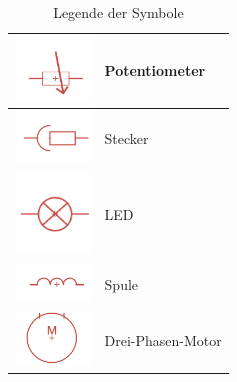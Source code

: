 \begin{table}[ht]
{\begin{tabular}{|m{5cm}|m{7cm}|}
			\hline
			\centering\includegraphics[width=2cm]{Legende/Potentiometer.png} & \centering Potentiometer \tabularnewline
			\hline
			\centering\includegraphics[width=2cm]{Legende/Stecker.png} & \centering Stecker \tabularnewline
			\hline
			\centering\includegraphics[width=2cm]{Legende/LED.png} & \centering LED \tabularnewline
			\hline
			\centering\includegraphics[width=2cm]{Legende/Spule.png} & \centering Spule \tabularnewline
			\hline
			\centering\includegraphics[width=2cm]{Legende/3 Phasen Motor.png} & \centering Drei-Phasen-Motor \tabularnewline
			\hline
	\end{tabular}}
	\caption{Legende der Symbole}
	\label{tab:legende}
\end{table}